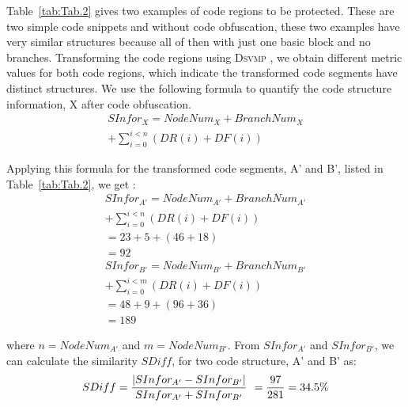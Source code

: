 \documentclass[times]{secauth}
\newcommand{\DSVMP}{\textsc{Dsvmp }}
\begin{document}
Table~\ref{tab:Tab.2} gives two examples of code regions to be protected. These are two simple code snippets and without code obfuscation, these two examples have very similar structures because all of then with just one basic block and no branches. Transforming the code regions using \DSVMP, we obtain different metric values for both code regions,
which indicate the transformed code segments have distinct structures.
We use the following formula to quantify the code structure information, X after code obfuscation.
\[\begin{array}{l}
 SInfo{r_{X}} = NodeNu{m_{X}} + BranchNu{m_{X}} \\
                                                 + \sum\limits_{i = 0}^{i < n} {(DR(i) + DF(i))}
 \end{array}\]

Applying this formula for the transformed code segments, A' and  B', listed in Table~\ref{tab:Tab.2},  we get :
\[\begin{array}{l}
 SInfo{r_{A'}} = NodeNu{m_{A'}} + BranchNu{m_{A'}} \\
                                                 + \sum\limits_{i = 0}^{i < n} {(DR(i) + DF(i))} \\
                                       = 23 + 5 + (46 + 18)\\
                                       = 92 %
\end{array}\]
\[\begin{array}{l}
 SInfo{r_{B'}} = NodeNu{m_{B'}} + BranchNu{m_{B'}} \\
                                                 + \sum\limits_{i = 0}^{i < m} {(DR(i) + DF(i))}  \\
                                        = 48 + 9 + (96 + 36)\\
                                        =  189
\end{array}\]

where $n=NodeNu{m_{A'}}$ and $m=NodeNu{m_{B'}}$. From $SInfo{r_{A'}}$ and $SInfo{r_{B'}}$,
we can calculate the similarity $SDiff$, for two code structure, A' and B' as:
\[SDiff = \frac{{|SInfo{r_{A'}} - SInfo{r_{B'}}|}}{{SInfo{r_{A'}} + SInfo{r_{B'}}}}\;{\kern 1pt}  = \frac{{97}}{{281}} = 34.5\% \]
\end{document}

